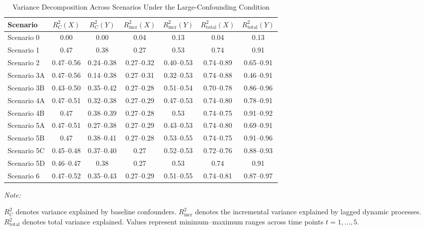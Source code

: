 \begin{table}[!h]
\centering
\caption{\label{tab:R2_large}Variance Decomposition Across Scenarios Under the Large-Confounding Condition}
\centering
\fontsize{10}{12}\selectfont
\begin{threeparttable}
\begin{tabular}[t]{lcccccc}
\toprule
Scenario & $R_C^2(X)$ & $R_C^2(Y)$ & $R_{\text{incr}}^2(X)$ & $R_{\text{incr}}^2(Y)$ & $R_{\text{total}}^2(X)$ & $R_{\text{total}}^2(Y)$\\
\midrule
Scenario 0 & 0.00 & 0.00 & 0.04 & 0.13 & 0.04 & 0.13\\
Scenario 1 & 0.47 & 0.38 & 0.27 & 0.53 & 0.74 & 0.91\\
Scenario 2 & 0.47--0.56 & 0.24--0.38 & 0.27--0.32 & 0.40--0.53 & 0.74--0.89 & 0.65--0.91\\
Scenario 3A & 0.47--0.56 & 0.14--0.38 & 0.27--0.31 & 0.32--0.53 & 0.74--0.88 & 0.46--0.91\\
Scenario 3B & 0.43--0.50 & 0.35--0.42 & 0.27--0.28 & 0.51--0.54 & 0.70--0.78 & 0.86--0.96\\
\addlinespace
Scenario 4A & 0.47--0.51 & 0.32--0.38 & 0.27--0.29 & 0.47--0.53 & 0.74--0.80 & 0.78--0.91\\
Scenario 4B & 0.47 & 0.38--0.39 & 0.27--0.28 & 0.53 & 0.74--0.75 & 0.91--0.92\\
Scenario 5A & 0.47--0.51 & 0.27--0.38 & 0.27--0.29 & 0.43--0.53 & 0.74--0.80 & 0.69--0.91\\
Scenario 5B & 0.47 & 0.38--0.41 & 0.27--0.28 & 0.53--0.55 & 0.74--0.75 & 0.91--0.96\\
Scenario 5C & 0.45--0.48 & 0.37--0.40 & 0.27 & 0.52--0.53 & 0.72--0.76 & 0.88--0.93\\
\addlinespace
Scenario 5D & 0.46--0.47 & 0.38 & 0.27 & 0.53 & 0.74 & 0.91\\
Scenario 6 & 0.47--0.52 & 0.35--0.43 & 0.27--0.29 & 0.51--0.55 & 0.74--0.81 & 0.87--0.97\\
\bottomrule
\end{tabular}
\begin{tablenotes}
\item \textit{Note: } 
\item $R_C^2$ denotes variance explained by baseline confounders. $R_{\text{incr}}^2$ denotes the incremental variance explained by lagged dynamic processes. $R_{\text{total}}^2$ denotes total variance explained. Values represent minimum--maximum ranges across time points $t = 1, \dots, 5$.
\end{tablenotes}
\end{threeparttable}
\end{table}
